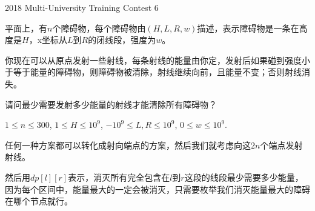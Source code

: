 \documentclass[11pt,serif]{beamer}
\begin{document}
	\begin{frame}{2018 Multi-University Training Contest 6}
		\begin{problem}
			平面上，有$n$个障碍物，每个障碍物由$(H,L,R,w)$描述，表示障碍物是一条在高度是$H$，x坐标从$L$到$R$的闭线段，强度为$w$。
			
			你现在可以从原点发射一些射线，每条射线的能量由你定，发射后如果碰到强度小于等于能量的障碍物，则障碍物被清除，射线继续向前，且能量不变；否则射线消失。
			
			请问最少需要发射多少能量的射线才能清除所有障碍物？
			
			$1 \leq n \leq 300$, $1 \leq H \leq 10^9$, $-10^9 \leq L, R \leq 10^9$, $0 \leq w \leq 10^9$.
		\end{problem}
	\end{frame}
	\begin{frame}
		\begin{solution}
			任何一种方案都可以转化成射向端点的方案，然后我们就考虑向这$2n$个端点发射射线。
			
			然后用$dp[l][r]$表示，消灭所有完全包含在$l$到$r$这段的线段最少需要多少能量，因为每个区间中，能量最大的一定会被消灭，只需要枚举我们消灭能量最大的障碍在哪个节点就行。
		\end{solution}
	\end{frame}
\end{document}
